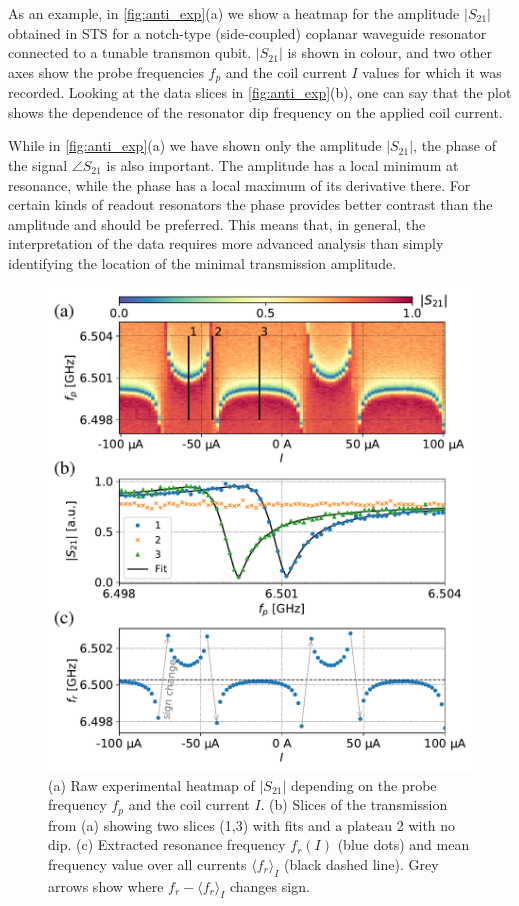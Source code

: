 \documentclass[%
 aip,
 amsmath,amssymb,
 reprint,%
]{revtex4-1}
\begin{document}
As an example, in \autoref{fig:anti_exp}(a) we show a heatmap for the amplitude $|S_{21}|$ obtained in STS for a notch-type (side-coupled) coplanar waveguide resonator connected to a tunable transmon qubit. $|S_{21}|$ is shown in colour, and two other axes show the probe frequencies $f_p$ and the coil current $I$ values for which it was recorded. Looking at the data slices in \autoref{fig:anti_exp}(b), one can say that the plot shows the dependence of the resonator dip frequency on the applied coil current. 

While in \autoref{fig:anti_exp}(a) we have shown only the amplitude $|S_{21}|$,  the phase of the signal $\angle S_{21}$ is also important. The amplitude has a local minimum at resonance, while the phase has a local maximum of its derivative there. For certain kinds of readout resonators the phase provides better contrast than the amplitude and should be preferred. This means that, in general, the interpretation of the data requires more advanced analysis than simply identifying the location of the minimal transmission amplitude.

\begin{figure}
\includegraphics[width=\linewidth]{anti_subplots}
\caption{(a) Raw experimental heatmap of $|S_{21}|$ depending on the probe frequency $f_p$ and the coil current $I$. (b) Slices of the transmission from (a) showing two slices (1,3) with fits and a plateau 2 with no dip. (c) Extracted resonance frequency $f_r(I)$ (blue dots) and mean frequency value over all currents $\langle f_r \rangle_{I}$ (black dashed line). Grey arrows show where $f_r - \langle f_r \rangle_{I}$ changes sign.}
\label{fig:anti_exp}
\end{figure}
\end{document}
